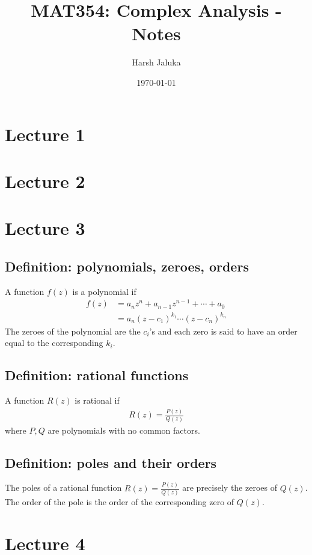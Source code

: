 \documentclass[11pt]{article}
\title{MAT354: Complex Analysis - Notes}
\author{Harsh Jaluka}
\date{\today}
\begin{document}
\begin{titlepage}
\maketitle 
\end{titlepage}

\newpage 
\tableofcontents

\newpage
\section{Lecture 1}

\section{Lecture 2}

\section{Lecture 3}
\subsection{Definition: polynomials, zeroes, orders}
A function $f(z)$ is a polynomial if 
\begin{align*}
    f(z) &= a_n z^n + a_{n-1}z^{n-1} + \cdots + a_0 \\
    &= a_n(z - c_1)^{k_1} \cdots (z - c_n)^{k_n}
\end{align*}
The zeroes of the polynomial are the $c_i$'s and each zero is said to have an order equal to the corresponding $k_i$. 

\subsection{Definition: rational functions}
A function $R(z)$ is rational if 
\begin{align*}
R(z) = \frac{P(z)}{Q(z)}
\end{align*}
where $P,Q$ are polynomials with no common factors. 

\subsection{Definition: poles and their orders}
The poles of a rational function $R(z) = \frac{P(z)}{Q(z)}$ are precisely the zeroes of $Q(z)$. The order of the pole is the order of the corresponding zero of $Q(z)$. 

\section{Lecture 4}
\end{document}
